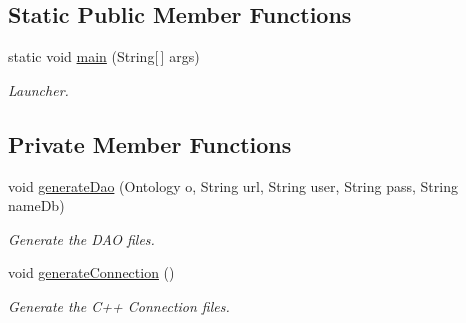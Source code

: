 \subsection*{Static Public Member Functions}
\begin{DoxyCompactItemize}
\item 
\hypertarget{class_gui_a147fb18eb48c8635f144795b1b3f79ad}{
static void \hyperlink{class_gui_a147fb18eb48c8635f144795b1b3f79ad}{main} (String\mbox{[}$\,$\mbox{]} args)}
\label{class_gui_a147fb18eb48c8635f144795b1b3f79ad}

\begin{DoxyCompactList}\small\item\em Launcher. \end{DoxyCompactList}\end{DoxyCompactItemize}
\subsection*{Private Member Functions}
\begin{DoxyCompactItemize}
\item 
void \hyperlink{class_gui_a328763db8d277612d5855a8ee4894cb1}{generateDao} (Ontology o, String url, String user, String pass, String nameDb)
\begin{DoxyCompactList}\small\item\em Generate the DAO files. \end{DoxyCompactList}\item 
\hypertarget{class_gui_a8a2287b6f261d3a0316cee677a2c156f}{
void \hyperlink{class_gui_a8a2287b6f261d3a0316cee677a2c156f}{generateConnection} ()}
\label{class_gui_a8a2287b6f261d3a0316cee677a2c156f}

\begin{DoxyCompactList}\small\item\em Generate the C++ Connection files. \end{DoxyCompactList}\end{DoxyCompactItemize}
